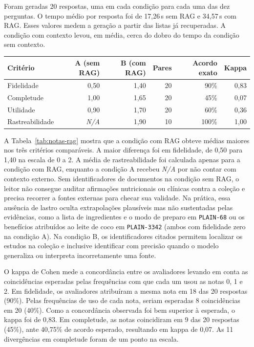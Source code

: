 \documentclass[12pt]{article}
\begin{document}
Foram geradas 20 respostas, uma em cada condição para cada uma das dez
perguntas. O tempo médio por resposta foi de 17,26\,s sem RAG e
34,57\,s com RAG. Esses valores medem a geração a partir das listas já
recuperadas. A condição com contexto levou, em média, cerca do dobro
do tempo da condição sem contexto.

\noindent\begin{minipage}{\linewidth}
\centering
\small
{}
\label{tab:notas-rag}
\begin{tabular}{@{}lrrrrr@{}}
\toprule
Critério & A (sem RAG) & B (com RAG) & Pares & Acordo exato & Kappa \\
\midrule
Fidelidade      & 0,50 & 1,40 & 20 & 90\%  & 0,83 \\
Completude      & 1,00 & 1,65 & 20 & 45\%  & 0,07 \\
Utilidade       & 0,90 & 1,70 & 20 & 60\%  & 0,36 \\
Rastreabilidade & \textit{N/A} & 1,90 & 10 & 100\% & 1,00 \\
\bottomrule
\end{tabular}
\end{minipage}
\par\medskip

A Tabela~\ref{tab:notas-rag} mostra que a condição com RAG obteve médias
maiores nos três critérios comparáveis. A maior diferença foi em
fidelidade, de 0,50 para 1,40 na escala de 0 a 2. A média de
rastreabilidade foi calculada apenas para a condição com RAG, enquanto a
condição A recebeu \textit{N/A} por não contar com contexto externo. Sem
identificadores de documentos na condição sem RAG, o leitor não consegue
auditar afirmações nutricionais ou clínicas contra a coleção e precisa
recorrer a fontes externas para checar sua validade. Na prática, essa
ausência de lastro oculta extrapolações plausíveis mas não sustentadas pelas
evidências, como a lista de ingredientes e o modo de preparo em
\texttt{PLAIN-68} ou os benefícios atribuídos ao leite de coco em
\texttt{PLAIN-3342} (ambos com fidelidade zero na condição A). Na condição B,
os identificadores citados permitem localizar os estudos na coleção e
inclusive identificar com precisão quando o modelo generaliza ou interpreta
incorretamente uma fonte.

O kappa de Cohen mede a concordância entre os avaliadores levando em
conta as coincidências esperadas pelas frequências com que cada um usou
as notas 0, 1 e 2. Em fidelidade, os avaliadores atribuíram a mesma nota
em 18 das 20 respostas (90\%). Pelas frequências de uso de cada nota,
seriam esperadas 8 coincidências em 20 (40\%). Como a concordância
observada foi bem superior à esperada, o kappa foi de 0,83. Em
completude, as notas coincidiram em 9 das 20 respostas (45\%), ante
40,75\% de acordo esperado, resultando em kappa de 0,07. As 11
divergências em completude foram de um ponto na escala.
\end{document}
